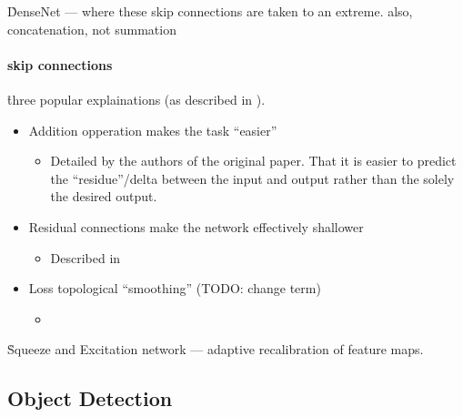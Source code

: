 \r{DenseNet --- where these skip connections are taken to an extreme. also, concatenation, not summation}

\paragraph{skip connections}


\r{three popular explainations (as described in \cite{lakshmanan2021practical}).}
\begin{itemize}[noitemsep,topsep=0pt]
	\item Addition opperation makes the task ``easier''
	\begin{itemize}[noitemsep,topsep=0pt]
		\item Detailed by the authors of the original paper. That it is easier to predict the ``residue''/delta between the input and output rather than the solely the desired output.
	\end{itemize}
	\item Residual connections make the network effectively shallower 
	\begin{itemize}[noitemsep,topsep=0pt]
		\item Described in 
	\end{itemize}
	\item Loss topological ``smoothing'' (TODO: change term)
	\begin{itemize}[noitemsep,topsep=0pt]
		\item {}
	\end{itemize}
\end{itemize}




\r{Squeeze and Excitation network --- adaptive recalibration of feature maps. \cite{DBLP:journals/corr/abs-1709-01507} }



\subsection{Object Detection}

